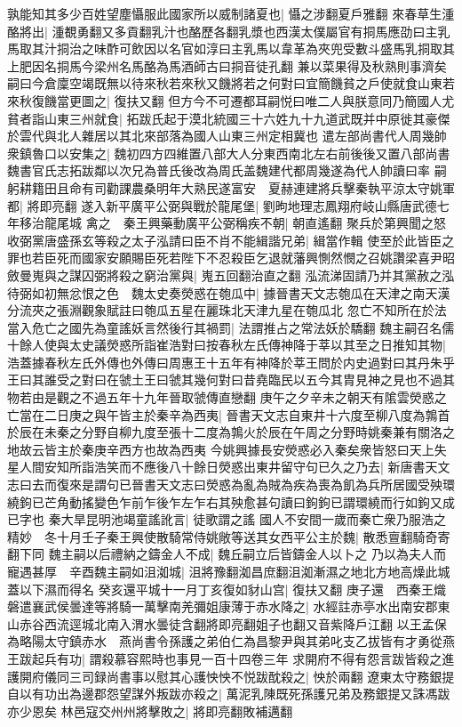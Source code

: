 孰能知其多少百姓望塵懾服此國家所以威制諸夏也|{
	懾之涉翻夏戶雅翻}
來春草生湩酪將出|{
	湩覩勇翻又多貢翻乳汁也酪歷各翻乳漿也西漢太僕屬官有挏馬應劭曰主乳馬取其汁挏治之味酢可飲因以名官如淳曰主乳馬以韋革為夾兜受數斗盛馬乳挏取其上肥因名挏馬今梁州名馬酪為馬酒師古曰挏音徒孔翻}
兼以菜果得及秋熟則事濟矣嗣曰今倉廩空竭既無以待來秋若來秋又饑將若之何對曰宜簡饑貧之戶使就食山東若來秋復饑當更圖之|{
	復扶又翻}
但方今不可遷都耳嗣悦曰唯二人與朕意同乃簡國人尤貧者詣山東三州就食|{
	拓跋氏起于漠北統國三十六姓九十九道武既并中原徙其豪傑於雲代與北人雜居以其北來部落為國人山東三州定相冀也}
遣左部尚書代人周幾帥衆鎮魯口以安集之|{
	魏初四方四維置八部大人分東西南北左右前後後又置八部尚書魏書官氏志拓跋鄰以次兄為普氏後改為周氏盖魏建代都周幾遂為代人帥讀曰率}
嗣躬耕籍田且命有司勸課農桑明年大熟民遂富安　夏赫連建將兵擊秦執平涼太守姚軍都|{
	將即亮翻}
遂入新平廣平公弼與戰於龍尾堡|{
	劉昫地理志鳳翔府岐山縣唐武德七年移治龍尾城}
禽之　秦王興藥動廣平公弼稱疾不朝|{
	朝直遙翻}
聚兵於第興聞之怒收弼黨唐盛孫玄等殺之太子泓請曰臣不肖不能緝諧兄弟|{
	緝當作輯}
使至於此皆臣之罪也若臣死而國家安願賜臣死若陛下不忍殺臣乞退就藩興惻然憫之召姚讚梁喜尹昭斂曼嵬與之謀囚弼將殺之窮治黨與|{
	嵬五回翻治直之翻}
泓流涕固請乃并其黨赦之泓待弼如初無忿恨之色　魏太史奏熒惑在匏瓜中|{
	據晉書天文志匏瓜在天津之南天漢分流夾之張淵觀象賦註曰匏瓜五星在麗珠北天津九星在匏瓜北}
忽亡不知所在於法當入危亡之國先為童謠妖言然後行其禍罰|{
	法謂推占之常法妖於驕翻}
魏主嗣召名儒十餘人使與太史議熒惑所詣崔浩對曰按春秋左氏傳神降于莘以其至之日推知其物|{
	浩蓋據春秋左氏外傳也外傳曰周惠王十五年有神降於莘王問於内史過對曰其丹朱乎王曰其誰受之對曰在虢土王曰虢其幾何對曰昔堯臨民以五今其胄見神之見也不過其物若由是觀之不過五年十九年晉取虢傳直戀翻}
庚午之夕辛未之朝天有隂雲熒惑之亡當在二日庚之與午皆主於秦辛為西夷|{
	晉書天文志自東井十六度至柳八度為鶉首於辰在未秦之分野自柳九度至張十二度為鶉火於辰在午周之分野時姚秦兼有關洛之地故云皆主於秦庚辛西方也故為西夷}
今姚興據長安熒惑必入秦矣衆皆怒曰天上失星人間安知所詣浩笑而不應後八十餘日熒惑出東井留守句已久之乃去|{
	新唐書天文志曰去而復來是謂句已晉書天文志曰熒惑為亂為賊為疾為喪為飢為兵所居國受殃環繞鉤已芒角動搖變色乍前乍後乍左乍右其殃愈甚句讀曰鉤鉤已謂環繞而行如鉤又成已字也}
秦大旱昆明池竭童謠訛言|{
	徒歌謂之謠}
國人不安間一歲而秦亡衆乃服浩之精妙　冬十月壬子秦王興使散騎常侍姚敞等送其女西平公主於魏|{
	散悉亶翻騎奇寄翻下同}
魏主嗣以后禮納之鑄金人不成|{
	魏丘嗣立后皆鑄金人以卜之}
乃以為夫人而寵遇甚厚　辛酉魏主嗣如沮洳城|{
	沮將豫翻洳昌庶翻沮洳漸濕之地北方地高燥此城蓋以下濕而得名}
癸亥還平城十一月丁亥復如豺山宫|{
	復扶又翻}
庚子還　西秦王熾磐遣襄武侯曇達等將騎一萬擊南羌彌姐康薄于赤水降之|{
	水經註赤亭水出南安郡東山赤谷西流逕城北南入渭水曇徒含翻將即亮翻姐子也翻又音紫降戶江翻}
以王孟保為略陽太守鎮赤水　燕尚書令孫護之弟伯仁為昌黎尹與其弟叱支乙拔皆有才勇從燕王跋起兵有功|{
	謂殺慕容熙時也事見一百十四卷三年}
求開府不得有怨言跋皆殺之進護開府儀同三司録尚書事以慰其心護怏怏不悦跋酖殺之|{
	怏於兩翻}
遼東太守務銀提自以有功出為邊郡怨望謀外叛跋亦殺之|{
	萬泥乳陳既死孫護兄弟及務銀提又誅馮跋亦少恩矣}
林邑寇交州州將擊敗之|{
	將即亮翻敗補邁翻}


